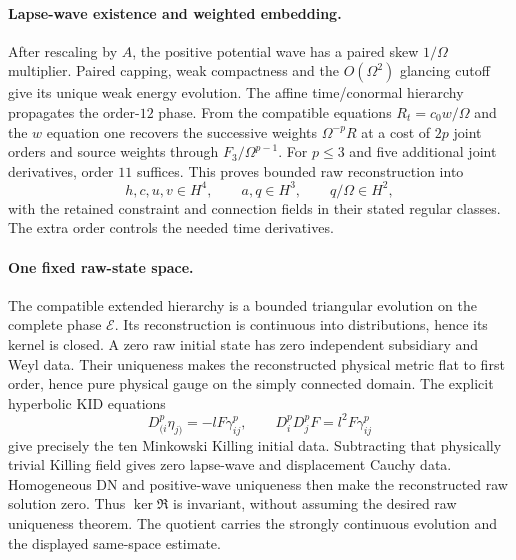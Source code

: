 \paragraph{Lapse-wave existence and weighted embedding.}
After rescaling by $A$, the positive potential wave has a paired skew
$1/\Omega$ multiplier. Paired capping, weak compactness and the
$O(\Omega^2)$ glancing cutoff give its unique weak energy evolution.
The affine time/conormal hierarchy propagates the order-$12$ phase.
From the compatible equations
$R_t=c_0w/\Omega$ and the $w$ equation one recovers the successive weights
$\Omega^{-p}R$ at a cost of $2p$ joint orders and source weights through
$F_3/\Omega^{p-1}$. For $p\le3$ and five additional joint derivatives,
order $11$ suffices. This proves bounded raw reconstruction into
\[
 h,c,u,v\in H^4,\qquad a,q\in H^3,\qquad q/\Omega\in H^2,
\]
with the retained constraint and connection fields in their stated
regular classes. The extra order controls the needed time derivatives.

\paragraph{One fixed raw-state space.}
The compatible extended hierarchy is a bounded triangular evolution on
the complete phase $\mathcal E$. Its reconstruction is continuous into
distributions, hence its kernel is closed.
A zero raw initial state has zero independent subsidiary and Weyl data.
Their uniqueness makes the reconstructed physical metric flat to first
order, hence pure physical gauge on the simply connected domain.
The explicit hyperbolic KID equations
\[
 D^p_{(i}\eta_{j)}=-lF\gamma^p_{ij},\qquad
 D^p_iD^p_jF=l^2F\gamma^p_{ij}
\]
give precisely the ten Minkowski Killing initial data.
Subtracting that physically trivial Killing field gives zero lapse-wave
and displacement Cauchy data. Homogeneous DN and positive-wave uniqueness
then make the reconstructed raw solution zero.
Thus $\ker\mathfrak R$ is invariant, without assuming the desired raw
uniqueness theorem. The quotient carries the strongly continuous
evolution and the displayed same-space estimate.

